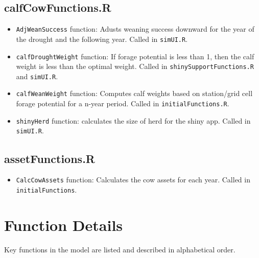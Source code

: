 \documentclass[11pt]{article}
\begin{document}
\subsection{calfCowFunctions.R}

\begin{itemize}
	\item \verb!AdjWeanSuccess! function: Adusts weaning success downward for the year of the drought and the following year. Called in \verb!simUI.R!.
	\item \verb!calfDroughtWeight! function: If forage potential is less than 1, then the calf weight is less than the optimal weight. Called in \verb!shinySupportFunctions.R! and \verb!simUI.R!.
	\item \verb!calfWeanWeight! function: Computes calf weights based on station/grid cell forage potential for a n-year period. Called in \verb!initialFunctions.R!.
	\item \verb!shinyHerd! function: calculates the size of herd for the shiny app. Called in \verb!simUI.R!.
\end{itemize}

\subsection{assetFunctions.R}
\begin{itemize}
	\item \verb!CalcCowAssets! function: Calculates the cow assets for each year. Called in \verb!initialFunctions!.
\end{itemize}


\section{Function Details}
Key functions in the model are listed and described in alphabetical order.
\end{document}
